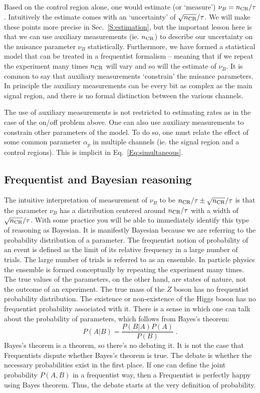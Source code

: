 \documentclass{cernrep}
\begin{document}
Based on the control region alone, one would estimate (or `measure') $\nu_B = n_{\rm CR}/\tau$.  Intuitively the estimate comes with an  `uncertainty' of $\sqrt{n_{\rm CR}}/\tau$.   We will make these points more precise in Sec.~\ref{S:estimation}, but the important lesson here is that we can use auxiliary measurements (ie. $n_{\rm CR}$) to describe our uncertainty on the nuisance parameter $\nu_B$ statistically.  Furthermore, we have formed a statistical model that can be treated in a frequentist formalism -- meaning that if we repeat the experiment many times $n_{\rm CR}$ will vary and so will the estimate of $\nu_B$.   It is common to say that auxiliary measurements `constrain' the nuisance parameters.  In principle the auxiliary measurements can be every bit as complex as the main signal region, and there is no formal distinction between the various channels.

The use of auxiliary measurements is not restricted to estimating rates as in the case of the on/off problem above.  One can also use auxiliary measurements to constrain other parameters of the model. To do so, one must relate the effect of some common parameter $\alpha_p$ in multiple channels (ie. the signal region and a control regions).   This is implicit in Eq.~\ref{Eq:simultaneous}.

\subsection{Frequentist and Bayesian reasoning}

The intuitive interpretation of measurement of $\nu_B$ to be $n_{\rm CR}/\tau \pm \sqrt{n_{\rm CR}}/\tau$ is that the parameter $\nu_B$ has a distribution centered around $n_{\rm CR}/\tau$ with a width of $\sqrt{n_{\rm CR}}/\tau$.  With some practice you will be able to immediately identify this type of reasoning as Bayesian.  It is manifestly Bayesian because we are referring to the probability distribution of a parameter.  The frequentist notion of probability of an event is defined as the limit of its relative frequency in a large number of trials.  The large number of trials is referred to as an ensemble.  In particle physics the ensemble is formed conceptually by repeating the experiment many times.  The true values of the parameters, on the other hand, are states of nature, not the outcome of an experiment.  The true mass of the $Z$ boson has no frequentist probability distribution.  The existence or non-existence of the Higgs boson has no frequentist probability associated with it.  There is a sense in which one can talk about the probability of parameters, which follows from Bayes's theorem:
\begin{equation}
\label{Eq:Bayes}
P(A|B) = \frac{P(B|A) P(A)}{P(B)} \; .
\end{equation}
Bayes's theorem is a theorem, so there's no debating it.  It is not the case that Frequentists dispute whether Bayes's theorem is true.  The debate is whether the necessary probabilities exist in the first place.  If one can define the joint probability $P(A,B)$ in a frequentist way, then a Frequentist is perfectly happy using Bayes theorem.   Thus, the debate starts at the very definition of probability.
\end{document}
